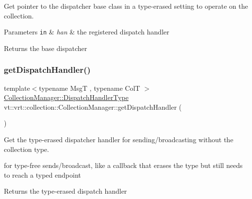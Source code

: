 Get pointer to the dispatcher base class in a type-\/erased setting to operate on the collection. 


\begin{DoxyParams}[1]{Parameters}
\mbox{\tt in}  & {\em han} & the registered dispatch handler\\
\hline
\end{DoxyParams}
\begin{DoxyReturn}{Returns}
the base dispatcher 
\end{DoxyReturn}
\mbox{\label{structvt_1_1vrt_1_1collection_1_1_collection_manager_ab672ad6c3bc9fdc5a9577a9ae0677d1f}} 
\subsubsection{\texorpdfstring{get\+Dispatch\+Handler()}{getDispatchHandler()}}
{\footnotesize\ttfamily template$<$typename MsgT , typename ColT $>$ \\
\hyperlink{structvt_1_1vrt_1_1collection_1_1_collection_manager_a0cfe02a0426e95ec9daa2ef7374e07c7}{Collection\+Manager\+::\+Dispatch\+Handler\+Type} vt\+::vrt\+::collection\+::\+Collection\+Manager\+::get\+Dispatch\+Handler (\begin{DoxyParamCaption}{ }\end{DoxyParamCaption})}



Get the type-\/erased dispatcher handler for sending/broadcasting without the collection type. 

for type-\/free sends/broadcast, like a callback that erases the type but still needs to reach a typed endpoint

\begin{DoxyReturn}{Returns}
the type-\/erased dispatch handler 
\end{DoxyReturn}
\mbox{\label{structvt_1_1vrt_1_1collection_1_1_collection_manager_a7db90d5e08077593edbff643b579c2cb}} 
